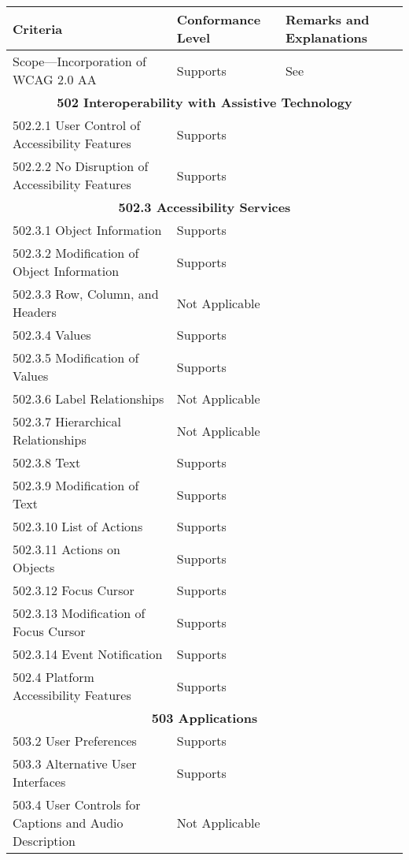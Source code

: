 \documentclass{report}
\begin{document}
\begin{longtable}{p{}<{\RaggedRight}p{}<{\RaggedRight}p{}<{\RaggedRight}}
  \toprule
  Criteria & Conformance Level & Remarks and Explanations \\
  \midrule
  \endhead
  \bottomrule
  \endfoot
  501.1 Scope---Incorporation of WCAG 2.0 AA & Supports & See
                                                          \nameref{sec:WCAG-AA}\\
  \multicolumn{3}{c}{\bfseries
  502 Interoperability with Assistive Technology}\\
  502.2.1 User Control of Accessibility Features & Supports\\
  502.2.2 No Disruption of Accessibility Features & Supports\\
  \multicolumn{3}{c}{\bfseries 502.3 Accessibility Services}\\
  502.3.1 Object Information & Supports\\
  502.3.2 Modification of Object Information & Supports\\
  502.3.3 Row, Column, and Headers & Not Applicable\\
  502.3.4 Values & Supports\\
  502.3.5 Modification of Values & Supports\\
  502.3.6 Label Relationships & Not Applicable\\
  502.3.7 Hierarchical Relationships & Not Applicable\\
  502.3.8 Text & Supports\\
  502.3.9 Modification of Text & Supports\\
  502.3.10 List of Actions & Supports\\
  502.3.11 Actions on Objects & Supports\\
  502.3.12 Focus Cursor & Supports\\
  502.3.13 Modification of Focus Cursor & Supports\\
  502.3.14 Event Notification & Supports\\
  502.4 Platform Accessibility Features & Supports\\
  \multicolumn{3}{c}{\bfseries 503 Applications}\\
  503.2 User Preferences & Supports\\
  503.3 Alternative User Interfaces & Supports\\
  503.4 User Controls for Captions and Audio Description & Not
                                                           Applicable\\ 

\end{longtable}
\end{document}
